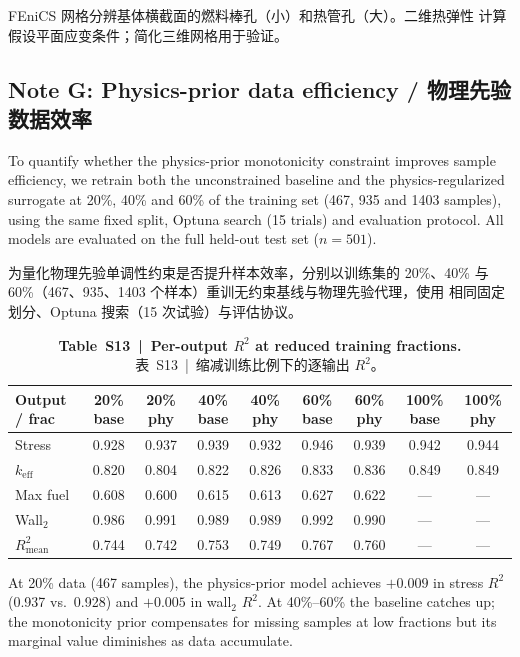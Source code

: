 \documentclass[11pt,a4paper]{article}
\newcommand{\keff}{\ensuremath{k_{\mathrm{eff}}}}
\begin{document}
FEniCS 网格分辨基体横截面的燃料棒孔（小）和热管孔（大）。二维热弹性
计算假设平面应变条件；简化三维网格用于验证。


\subsection{Note G: Physics-prior data efficiency /
物理先验数据效率}
\label{sec:noteG}

To quantify whether the physics-prior monotonicity constraint improves
sample efficiency, we retrain both the unconstrained baseline and the
physics-regularized surrogate at 20\%, 40\% and 60\% of the training
set (467, 935 and 1403 samples), using the same fixed split, Optuna
search (15 trials) and evaluation protocol. All models are evaluated on
the full held-out test set ($n = 501$).

为量化物理先验单调性约束是否提升样本效率，分别以训练集的 20\%、40\%
与 60\%（467、935、1403 个样本）重训无约束基线与物理先验代理，使用
相同固定划分、Optuna 搜索（15 次试验）与评估协议。

\begin{table}[htbp]
\centering
\caption{\textbf{Table~S13~|~Per-output $R^2$ at reduced training
fractions.}\\
\small 表~S13~|~缩减训练比例下的逐输出 $R^2$。}
\label{tab:S13}
\smallskip\small
\begin{tabular}{lcccccccc}
\toprule
Output / frac & 20\% base & 20\% phy & 40\% base & 40\% phy & 60\% base & 60\% phy & 100\% base & 100\% phy \\
\midrule
Stress    & 0.928 & 0.937 & 0.939 & 0.932 & 0.946 & 0.939 & 0.942 & 0.944 \\
\keff{}   & 0.820 & 0.804 & 0.822 & 0.826 & 0.833 & 0.836 & 0.849 & 0.849 \\
Max fuel  & 0.608 & 0.600 & 0.615 & 0.613 & 0.627 & 0.622 & ---   & ---   \\
Wall$_2$  & 0.986 & 0.991 & 0.989 & 0.989 & 0.992 & 0.990 & ---   & ---   \\
$R^2_{\mathrm{mean}}$ & 0.744 & 0.742 & 0.753 & 0.749 & 0.767 & 0.760 & --- & --- \\
\bottomrule
\end{tabular}
\end{table}

At 20\% data (467 samples), the physics-prior model achieves $+0.009$ in
stress $R^2$ (0.937 vs.\ 0.928) and $+0.005$ in wall$_2$ $R^2$. At
40\%--60\% the baseline catches up; the monotonicity prior compensates
for missing samples at low fractions but its marginal value diminishes
as data accumulate.
\end{document}
